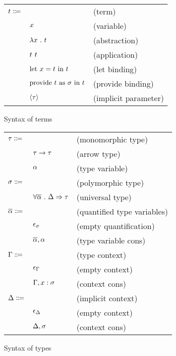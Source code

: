 \documentclass[acmlarge]{acmart}
\begin{document}
  \begin{figure}[h!]
    \begin{mdframed}

      \begin{tabular}{l l l}
        $t \Coloneqq $ & & (term) \\
        & $x$ & (variable) \\
        & $\lambda x \ . \ t$ & (abstraction) \\
        & $t \ t$ & (application) \\
        & $\text{let } x = t \text{ in } t$ & (let binding) \\
        & $\text{provide } t \text{ as } \sigma \text{ in } t$ & (provide binding) \\
        & $\left\langle \tau \right\rangle$ & (implicit parameter)
      \end{tabular}

    \end{mdframed}
    \caption{Syntax of terms}
    \label{fig:terms_syntax}
  \end{figure}

  \begin{figure}[h!]
    \begin{mdframed}

      \begin{tabular}{l l l}
        $\tau \Coloneqq$ & & (monomorphic type) \\
        & $\tau \rightarrow \tau$ & (arrow type) \\
        & $\alpha$ & (type variable) \\
        $\sigma \Coloneqq$ & & (polymorphic type) \\
        & $\forall \overline{\alpha} \ . \ \Delta \Rightarrow \tau$ & (universal type) \\
        $\overline{\alpha} \Coloneqq$ & & (quantified type variables) \\
        & $\epsilon_{\sigma}$ & (empty quantification) \\
        & $\overline{\alpha}, {\alpha}$ & (type variable cons) \\
        $\Gamma \Coloneqq$ & & (type context) \\
        & $\epsilon_{\Gamma}$ & (empty context) \\
        & $\Gamma, x : \sigma$ & (context cons) \\
        $\Delta \Coloneqq$ & & (implicit context) \\
        & $\epsilon_{\Delta}$ & (empty context) \\
        & $\Delta, \sigma$ & (context cons)
      \end{tabular}

    \end{mdframed}
    \caption{Syntax of types}
    \label{fig:types_syntax}
  \end{figure}
\end{document}
